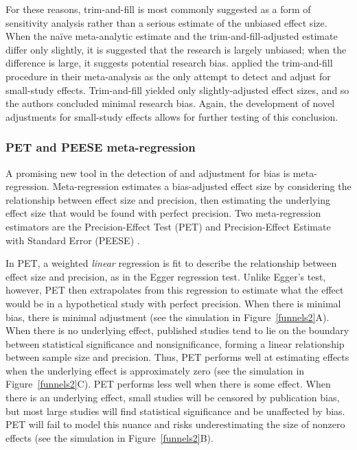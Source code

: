 \documentclass[man, mask]{apa6}
\begin{document}
For these reasons, trim-and-fill is most commonly suggested as a form of sensitivity analysis rather than a serious estimate of the unbiased effect size. When the na{\"i}ve meta-analytic estimate and the trim-and-fill-adjusted estimate differ only slightly, it is suggested that the research is largely unbiased; when the difference is large, it suggests potential research bias.
\citet{Anderson:etal:2010} applied the trim-and-fill procedure in their meta-analysis as the only attempt to detect and adjust for small-study effects. Trim-and-fill yielded only slightly-adjusted effect sizes, and so the authors concluded minimal research bias.
Again, the development of novel adjustments for small-study effects allows for further testing of this conclusion.

\subsubsection{PET and PEESE meta-regression}
A promising new tool in the detection of and adjustment for bias is meta-regression. Meta-regression estimates a bias-adjusted effect size by considering the relationship between effect size and precision, then estimating the underlying effect size that would be found with perfect precision. Two meta-regression estimators are the Precision-Effect Test (PET) and Precision-Effect Estimate with Standard Error (PEESE) \citep{Stanley:Doucouliagos:2014}. %

In PET, a weighted {\em linear} regression is fit to describe the relationship between effect size and precision, as in the Egger regression test. Unlike Egger's test, however, PET then extrapolates from this regression to estimate what the effect would be in a hypothetical study with perfect precision. When there is minimal bias, there is minimal adjustment (see the simulation in Figure~\ref{funnels2}A). When there is no underlying effect, published studies tend to lie on the boundary between statistical significance and nonsignificance, forming a linear relationship between sample size and precision. Thus, PET performs well at estimating effects when the underlying effect is approximately zero (see the simulation in Figure~\ref{funnels2}C). PET performs less well when there is some effect. When there is an underlying effect, small studies will be censored by publication bias, but most large studies will find statistical significance and be unaffected by bias. PET will fail to model this nuance and risks underestimating the size of nonzero effects (see the simulation in Figure~\ref{funnels2}B).
\end{document}
